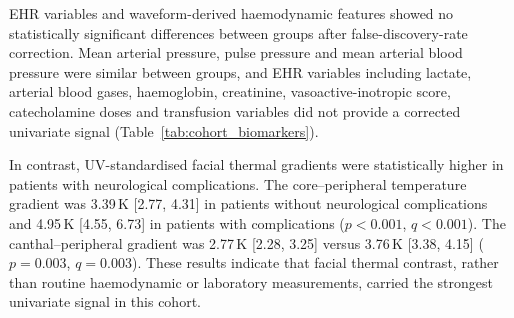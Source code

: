 \documentclass[pdflatex,sn-basic,Numbered]{sn-jnl}
\theoremstyle{thmstyleone}%
\theoremstyle{thmstyletwo}%
\theoremstyle{thmstylethree}%
\begin{document}
EHR variables and waveform-derived haemodynamic features showed no statistically significant differences between groups after false-discovery-rate correction. Mean arterial pressure, pulse pressure and mean arterial blood pressure were similar between groups, and EHR variables including lactate, arterial blood gases, haemoglobin, creatinine, vasoactive-inotropic score, catecholamine doses and transfusion variables did not provide a corrected univariate signal (Table~\ref{tab:cohort_biomarkers}).

In contrast, UV-standardised facial thermal gradients were statistically higher in patients with neurological complications. The core--peripheral temperature gradient was 3.39\,K [2.77, 4.31] in patients without neurological complications and 4.95\,K [4.55, 6.73] in patients with complications ($p<0.001$, $q<0.001$). The canthal--peripheral gradient was 2.77\,K [2.28, 3.25] versus 3.76\,K [3.38, 4.15] ($p=0.003$, $q=0.003$). These results indicate that facial thermal contrast, rather than routine haemodynamic or laboratory measurements, carried the strongest univariate signal in this cohort.
\end{document}
